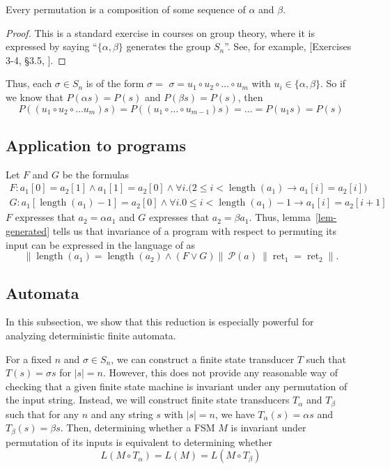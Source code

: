 \documentclass{llncs}
\DeclareMathOperator{\len}{length}
\DeclareMathOperator{\ret}{ret}
\begin{document}
  \begin{lemma} \label{lem-generated}
    Every permutation is a composition of some sequence of $\alpha$ and $\beta$.
  \end{lemma}
  \begin{proof}
    This is a standard exercise in courses on group theory,
    where it is expressed by saying ``$\{\alpha,\beta\}$ generates 
    the group $S_n$''.
    See, for example, [Exercises 3-4, \S3.5, \cite{dummitfoote}].
  \end{proof}

  Thus, each $\sigma \in S_n$ is of the form $\sigma = $
  $\sigma = u_1 \circ u_2 \circ \ldots \circ u_m$ with
  $u_i \in \{\alpha,\beta\}$.
  So if we know that $P(\alpha s) = P(s)$ and $P(\beta s) = P(s)$,
  then 
  \[ P((u_1\circ u_2\circ \ldots u_m)s)
      = P((u_1 \circ \ldots \circ u_{m-1})s)
    = \ldots = P(u_1s) = P(s)
  \]


  \subsection{Application to programs}

    Let \(F\) and \(G\) be the formulas
    \begin{gather*}
        F: a_{1}[0] = a_{2}[1] \wedge a_{1}[1] = a_{2}[0] \wedge 
          \forall i.\big( 2 \leq i < \len(a_{1}) \rightarrow a_{1}[i] = a_{2}[i] \big) \\
          G:  a_{1}[\len(a_{1})-1] = a_{2}[0] \wedge \forall i. 0 \leq i < \len(a_{1})-1 \rightarrow a_{1}[i] = a_{2}[i+1]
    \end{gather*}
    $F$ expresses that $a_2 = \alpha a_1$ and $G$ expresses that 
    $a_2 = \beta a_1$.
    Thus, lemma~\ref{lem-generated} tells us that
    invariance of a program with respect to permuting its input
    can be expressed in the language of \cite{sousa16} as
    \[
      \|\len(a_{1}) = \len(a_{2}) \wedge (F \vee G)\| \ 
        \mathcal{P}(a) \  \|\ret_{1} = \ret_{2}\|.
    \]

  \subsection{Automata}
    In this subsection, we show that this reduction is especially powerful for
    analyzing deterministic finite automata.

    For a fixed $n$ and $\sigma \in S_n$, we can construct a finite state
    transducer $T$ such that $T(s) = \sigma s$ for $|s|=n$.  However, this does
    not provide any reasonable way of checking that a given finite state machine
    is invariant under any permutation of the input string.  Instead, we will
    construct finite state transducers $T_{\alpha}$ and $T_{\beta}$ such that
    for any $n$ and any string $s$ with $|s|=n$, we have $T_{\alpha}(s)=\alpha s$
    and $T_{\beta}(s) =\beta s$. Then, determining whether a FSM $M$ is
    invariant under permutation of its inputs is equivalent to determining
    whether
    \[
      L(M \circ T_\alpha) = L(M) = L(M \circ T_\beta)
    \]
\end{document}
